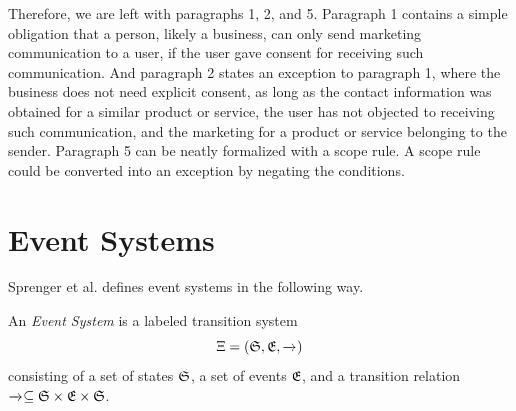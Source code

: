 Therefore, we are left with paragraphs 1, 2, and 5.
Paragraph 1 contains a simple obligation that
a person, likely a business, can only send
marketing communication to a user, if the user
gave consent for receiving such communication.
And paragraph 2 states an exception to paragraph 1,
where the business does not need explicit consent,
as long as the contact information was obtained for
a similar product or service, the user has not
objected to receiving such communication, and
the marketing for a product or service belonging
to the sender.
Paragraph 5 can be neatly formalized with a scope
rule.
A scope rule could be converted into an
exception by negating the conditions.


\section{Event Systems}
\label{section:event-systems}

Sprenger et al. \cite{igloo} defines event systems in the following way.

\begin{definition}
    \label{def:event-system}
    An \emph{Event System} is a labeled transition system
    $$
    \Xi = \left(\mathfrak{S}, \mathfrak{E}, \xrightarrow{}_{} \right)
    $$
    consisting of a set of states $\mathfrak{S}$,
    a set of events $\mathfrak{E}$,
    and a transition relation
    $\xrightarrow{}_{} \subseteq \mathfrak{S} \times \mathfrak{E} \times \mathfrak{S}$.
\end{definition}

